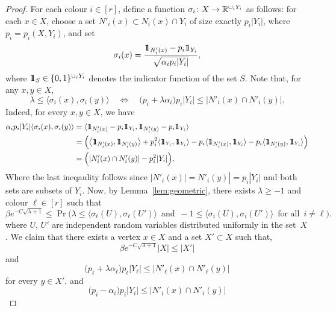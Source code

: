 \begin{proof}

  For each colour $i \in [r]$, define a function $\sigma_i \colon X \rightarrow \mathbb{R}^{\cup_i Y_i}$ as follows: for each $x \in X$, choose a set $N'_i(x) \subset N_i(x) \cap Y_i$ of size exactly $p_i|Y_i|$, where $p_i = p_i(X,Y_i)$, and set
  $$\sigma_i(x) = \frac{\hbox{\(1\mkern-6.5mu1\)}_{N'_i(x)} - p_i\hbox{\(1\mkern-6.5mu1\)}_{Y_i}}{\sqrt{\alpha_ip_i|Y_i|}},$$
  where $\hbox{\(1\mkern-6.5mu1\)}_S \in \{0,1\}^{\cup_i Y_i}$ denotes the indicator function of the set $S$. Note that, for any $x,y\in X$,
  $$\lambda \le \big\langle \sigma_i(x),\sigma_i(y) \big\rangle \quad \Leftrightarrow \quad \big( p_i + \lambda\alpha_i \big) p_i |Y_i| \le |N'_i(x) \cap N'_i(y)|.$$
  Indeed, for every $x,y\in X$, we have 
  \begin{multline}
    \begin{aligned}
            \alpha_ip_i|Y_i| \langle \sigma_i(x),\sigma_i(y) \rangle &= \langle \id_{N'_i(x)}- p_i\id_{Y_i},\id_{N'_i(y)}- p_i\id_{Y_i}\rangle\\
            &= \Bigl(\big\langle \id_{N'_i(x)},\id_{N'_i(y)}\big\rangle +p_i^2\langle \id_{Y_i},
            \id_{Y_i}\rangle - p_i \langle \id_{N'_i(x)},\id_{Y_i}\rangle- p_i \langle \id_{N'_i(y)},\id_{Y_i}\rangle\Bigr)\\
            &= \Bigl(|N'_i(x) \cap N'_i(y)|-p_i^2|Y_i| \Bigr),
    \end{aligned}
  \end{multline}
  Where the last ineqaulity follows since $|N'_i(x)|= N'_i(y)|= p_i|Y_i|$ and both sets are subsets of $Y_i$.
  Now, by Lemma~\ref{lem:geometric}, there exists $\lambda \ge -1$ and colour $\ell \in [r]$ such that
  \begin{equation}
    \label{eq: geometric-app}
    \beta e^{- C\sqrt{\lambda + 1}} \le \Pr\Big( \lambda  \le \big\langle \sigma_\ell(U),\sigma_\ell(U') \big\rangle \, \text{ and } \, -1 \le \big\langle \sigma_i(U), \sigma_i(U') \big\rangle \, \text{ for all } \, i \ne \ell \Big) .
  \end{equation}
  where $U$, $U'$ are independent random variables distributed uniformly in the set~$X$. We claim that there exists a vertex $x \in X$ and a set $X' \subset X$
  such that,
  $$\beta e^{- C \sqrt{\lambda + 1}} |X| \le |X'|$$ %
  and
  $$\big( p_\ell + \lambda\alpha_\ell \big) p_\ell |Y_\ell | \le |N'_\ell(x) \cap N'_\ell(y)|$$
  for every $y \in X'$, and
  $$\big( p_i - \alpha_i \big) p_i |Y_i| \le |N'_i(x) \cap N'_i(y)|$$

\end{proof}
